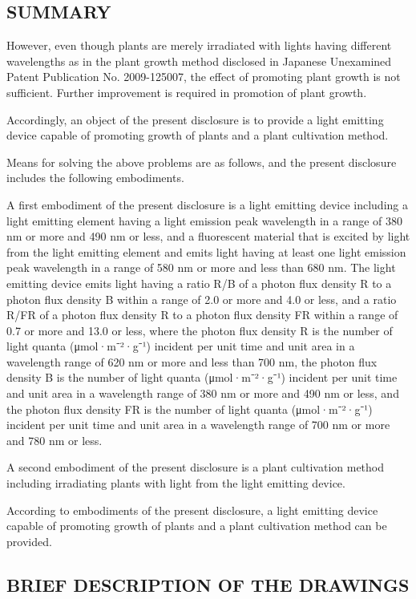 \documentclass[11pt,a4paper]{article}
\begin{document}
\subsection{SUMMARY}

However, even though plants are merely irradiated with lights having different wavelengths as in the plant growth method disclosed in Japanese Unexamined Patent Publication No. 2009-125007, the effect of promoting plant growth is not sufficient. Further improvement is required in promotion of plant growth.

Accordingly, an object of the present disclosure is to provide a light emitting device capable of promoting growth of plants and a plant cultivation method.

Means for solving the above problems are as follows, and the present disclosure includes the following embodiments.

A first embodiment of the present disclosure is a light emitting device including a light emitting element having a light emission peak wavelength in a range of 380 nm or more and 490 nm or less, and a fluorescent material that is excited by light from the light emitting element and emits light having at least one light emission peak wavelength in a range of 580 nm or more and less than 680 nm. The light emitting device emits light having a ratio R/B of a photon flux density R to a photon flux density B within a range of 2.0 or more and 4.0 or less, and a ratio R/FR of a photon flux density R to a photon flux density FR within a range of 0.7 or more and 13.0 or less, where the photon flux density R is the number of light quanta (μmol·m⁻²·g⁻¹) incident per unit time and unit area in a wavelength range of 620 nm or more and less than 700 nm, the photon flux density B is the number of light quanta (μmol·m⁻²·g⁻¹) incident per unit time and unit area in a wavelength range of 380 nm or more and 490 nm or less, and the photon flux density FR is the number of light quanta (μmol·m⁻²·g⁻¹) incident per unit time and unit area in a wavelength range of 700 nm or more and 780 nm or less.

A second embodiment of the present disclosure is a plant cultivation method including irradiating plants with light from the light emitting device.

According to embodiments of the present disclosure, a light emitting device capable of promoting growth of plants and a plant cultivation method can be provided.

\subsection{BRIEF DESCRIPTION OF THE DRAWINGS}
\end{document}
